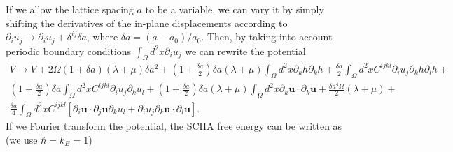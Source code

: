 If we allow the lattice spacing $a$ to be a variable, we can vary it by simply shifting the derivatives of the 
in-plane displacements according to $\partial_{i}u_{j}\rightarrow\partial_{i}u_{j}+\delta^{ij}\delta a$, where
$\delta a=(a-a_{0})/a_{0}$. Then, by taking into account periodic boundary conditions 
$\int_{\Omega}{d^{2}x\partial_{i}u_{j}}$ we can rewrite the potential
\begin{multline}
 \label{deltaa-potential}
 V\rightarrow V+2\Omega(1+\delta a)(\lambda+\mu)\delta a^{2}+(1+\frac{\delta a}{2})\delta a(\lambda+\mu)\int_{\Omega}{d^{2}x\partial_{k}h\partial_{k}h}+\frac{\delta a}{2}\int_{\Omega}{d^{2}xC^{ijkl}\partial_{i}u_{j}\partial_{k}h\partial_{
 l}h}+\\(1+\frac{\delta a}{2})\delta a\int_{\Omega}{d^{2}xC^{ijkl}\partial_{i}u_{j}\partial_{k}u_{l}}+(1+\frac{\delta a}{2})\delta a(\lambda+\mu)\int_{\Omega}{d^{2}x\partial_{k}\boldsymbol{
 u}\cdot\partial_{k}\boldsymbol{u}}+\frac{\delta a^{4}\Omega}{2}(\lambda+\mu)+\\\frac{\delta a}{4}\int_{\Omega}{d^{2}xC^{ijkl}[\partial_{i}\boldsymbol{u}\cdot\partial_{j}\boldsymbol{u}\partial_{k}u_{l}+\partial_{
 i}u_{j}\partial_{k}\boldsymbol{u}\cdot\partial_{l}\boldsymbol{u}]}.
\end{multline}
If we Fourier transform the potential, the SCHA free energy can be written as (we use $\hbar=k_{B}=1$)
